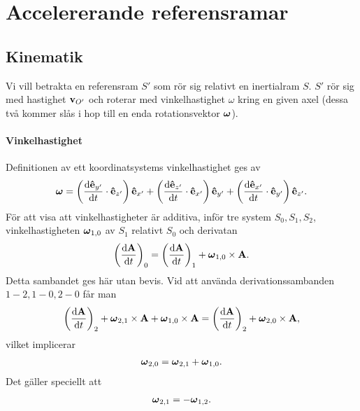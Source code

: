 \section{Accelererande referensramar}

\subsection{Kinematik}

Vi vill betrakta en referensram $S'$ som rör sig relativt en inertialram $S$. $S'$ rör sig med hastighet $\vb{v}_{O'}$ och roterar med vinkelhastighet $\omega$ kring en given axel (dessa två kommer slås i hop till en enda rotationsvektor $\vb*{\omega}$).

\paragraph{Vinkelhastighet}
Definitionen av ett koordinatsystems vinkelhastighet ges av
\begin{align*}
	\vb*{\omega} = \left(\dv{\vu{e}_{y'}}{t}\cdot\vu{e}_{z'}\right)\vu{e}_{x'} + \left(\dv{\vu{e}_{z'}}{t}\cdot\vu{e}_{x'}\right)\vu{e}_{y'} + \left(\dv{\vu{e}_{x'}}{t}\cdot\vu{e}_{y'}\right)\vu{e}_{z'}.
\end{align*}
För att visa att vinkelhastigheter är additiva, inför tre system $S_0, S_1, S_2$, vinkelhastigheten $\vb*{\omega}_{1, 0}$ av $S_1$ relativt $S_0$ och derivatan
\begin{align*}
	\left(\dv{\vb{A}}{t}\right)_{0} = \left(\dv{\vb{A}}{t}\right)_{1} + \vb*{\omega}_{1, 0}\times\vb{A}.
\end{align*}
Detta sambandet ges här utan bevis. Vid att använda derivationssambanden $1 - 2, 1 - 0, 2 - 0$ får man
\begin{align*}
	\left(\dv{\vb{A}}{t}\right)_{2} + \vb*{\omega}_{2, 1}\times\vb{A} + \vb*{\omega}_{1, 0}\times\vb{A} = \left(\dv{\vb{A}}{t}\right)_{2} + \vb*{\omega}_{2, 0}\times\vb{A},
\end{align*}
vilket implicerar
\begin{align*}
	\vb*{\omega}_{2, 0} = \vb*{\omega}_{2, 1} + \vb*{\omega}_{1, 0}.
\end{align*}
Det gäller speciellt att
\begin{align*}
	\vb*{\omega}_{2, 1} = -\vb*{\omega}_{1, 2}.
\end{align*}

